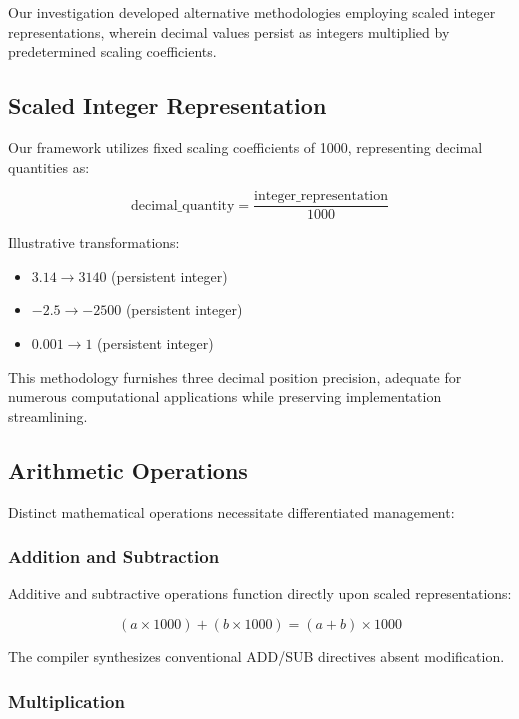 \documentclass[conference,10pt,twocolumn]{IEEEtran}
\begin{document}
Our investigation developed alternative methodologies employing scaled integer representations, wherein decimal values persist as integers multiplied by predetermined scaling coefficients.

\subsection{Scaled Integer Representation}

Our framework utilizes fixed scaling coefficients of 1000, representing decimal quantities as:

\begin{equation}
\text{decimal\_quantity} = \frac{\text{integer\_representation}}{1000}
\end{equation}

Illustrative transformations:
\begin{itemize}
\item $3.14 \rightarrow 3140$ (persistent integer)
\item $-2.5 \rightarrow -2500$ (persistent integer)
\item $0.001 \rightarrow 1$ (persistent integer)
\end{itemize}

This methodology furnishes three decimal position precision, adequate for numerous computational applications while preserving implementation streamlining.

\subsection{Arithmetic Operations}

Distinct mathematical operations necessitate differentiated management:

\subsubsection{Addition and Subtraction}

Additive and subtractive operations function directly upon scaled representations:

\begin{equation}
(a \times 1000) + (b \times 1000) = (a + b) \times 1000
\end{equation}

The compiler synthesizes conventional ADD/SUB directives absent modification.

\subsubsection{Multiplication}
\end{document}
